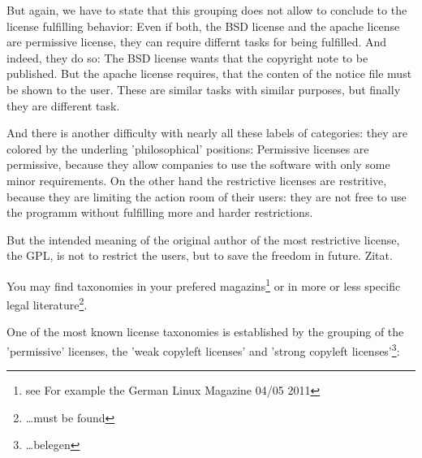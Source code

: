 \begin{center}
\end{center}

But again, we have to state that this grouping does not allow to conclude to the
license fulfilling behavior: Even if both, the BSD license and the apache
license are permissive license, they can require differnt tasks for being
fulfilled. And indeed, they do so: The BSD license wants that the copyright note
to be published. But the apache license requires, that the conten of the notice
file must be shown to the user. These are similar tasks with similar purposes,
but finally they are different task.

And there is another difficulty with nearly all these labels of categories: they
are colored by the underling 'philosophical' positions: Permissive licenses are
permissive, because they allow companies to use the software with only some
minor requirements. On the other hand the restrictive licenses are restritive,
because they are limiting the action room of their users: they are not free to
use the programm without fulfilling more and harder restrictions.

But the intended meaning of the original author of the most restrictive license,
the GPL, is not to restrict the users, but to save the freedom in future. Zitat.




You may find taxonomies in your prefered magazins\footnote{see For example the
German Linux Magazine 04/05 2011
} or in more or less specific legal literature\footnote{\ldots must be found
}.

One of the most known license taxonomies is established by the grouping of the
'permissive' licenses, the 'weak copyleft licenses' and 'strong copyleft
licenses'\footnote{ \ldots belegen
}:

